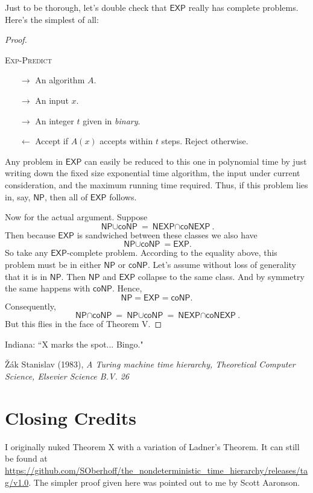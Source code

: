 \documentclass{article}
\newcommand{\EXP}{\ensuremath{\textsf{EXP}}}
\newcommand{\NP}{\ensuremath{\textsf{NP}}}
\newcommand{\coNP}{\ensuremath{\textsf{coNP}}}
\newcommand{\interP}{\ensuremath{\textsf{NP}\cap\textsf{coNP}}}
\newcommand{\interEXP}{\ensuremath{\textsf{NEXP}\cap\textsf{coNEXP}}}
\newcommand{\unionP}{\ensuremath{\textsf{NP}\cup\textsf{coNP}}}
\begin{document}
Just to be thorough, let's double check that $\EXP$ really has complete problems. Here's the simplest of all:

\begin{proof}
\begin{mdframed}
\textsc{Exp-Predict}
\begin{itemize}[noitemsep,topsep=0.3em]
\item[$\longrightarrow$] An algorithm $A$.
\item[$\longrightarrow$] An input $x$.
\item[$\longrightarrow$] An integer $t$ given in \textit{binary}.
\end{itemize}
\begin{itemize}[noitemsep,topsep=0.3em]
\item[$\longleftarrow$] Accept if $A(x)$ accepts within $t$ steps. Reject otherwise.
\end{itemize}
\end{mdframed}
Any problem in $\EXP$ can easily be reduced to this one in polynomial time by just writing down the fixed size exponential time algorithm, the input under current consideration, and the maximum running time required. Thus, if this problem lies in, say, $\NP$, then all of $\EXP$ follows.

Now for the actual argument. Suppose
\[
\unionP = \interEXP.
\]
Then because $\EXP$ is sandwiched between these classes we also have
\[
\unionP = \EXP.
\]
So take any $\EXP$-complete problem. According to the equality above, this problem must be in either $\NP$ or $\coNP$. Let's assume without loss of generality that it is in $\NP$. Then $\NP$ and $\EXP$ collapse to the same class. And by symmetry the same happens with $\coNP$. Hence,
\[
\NP = \EXP = \coNP.
\]
Consequently,
\[
\interP = \unionP = \interEXP.
\]
But this flies in the face of Theorem V. \lightning
\end{proof}

Indiana: ``X marks the spot... Bingo."

\begin{thebibliography}{1}
Žák Stanislav (1983), \textit{A Turing machine time hierarchy, Theoretical Computer Science, Elsevier Science B.V. 26}
\end{thebibliography}

\section*{Closing Credits}

I originally nuked Theorem X with a variation of Ladner's Theorem. It can still be found at \url{https://github.com/SOberhoff/the_nondeterministic_time_hierarchy/releases/tag/v1.0}. The simpler proof given here was pointed out to me by Scott Aaronson.

\vfill\eject
\end{document}
